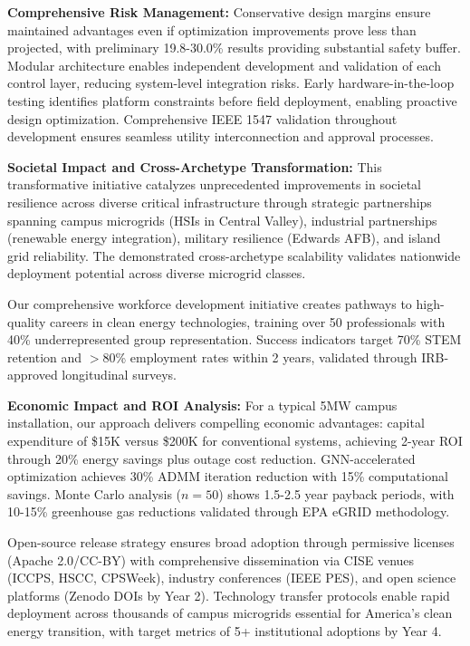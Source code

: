 \documentclass[12pt]{article}
\begin{document}
\textbf{Comprehensive Risk Management:} Conservative design margins ensure maintained advantages even if optimization improvements prove less than projected, with preliminary 19.8-30.0\% results providing substantial safety buffer. Modular architecture enables independent development and validation of each control layer, reducing system-level integration risks. Early hardware-in-the-loop testing identifies platform constraints before field deployment, enabling proactive design optimization. Comprehensive IEEE 1547 validation \cite{ieee1547} throughout development ensures seamless utility interconnection and approval processes.

\textbf{Societal Impact and Cross-Archetype Transformation:} This transformative initiative catalyzes unprecedented improvements in societal resilience across diverse critical infrastructure through strategic partnerships spanning campus microgrids (HSIs in Central Valley), industrial partnerships (renewable energy integration), military resilience (Edwards AFB), and island grid reliability. The demonstrated cross-archetype scalability validates nationwide deployment potential across diverse microgrid classes.

Our comprehensive workforce development initiative creates pathways to high-quality careers in clean energy technologies, training over 50 professionals with 40\% underrepresented group representation. Success indicators target 70\% STEM retention and $>$80\% employment rates within 2 years, validated through IRB-approved longitudinal surveys.

\textbf{Economic Impact and ROI Analysis:} For a typical 5MW campus installation, our approach delivers compelling economic advantages: capital expenditure of \$15K versus \$200K for conventional systems, achieving 2-year ROI through 20\% energy savings plus outage cost reduction. GNN-accelerated optimization achieves 30\% ADMM iteration reduction with 15\% computational savings. Monte Carlo analysis ($n=50$) shows 1.5-2.5 year payback periods, with 10-15\% greenhouse gas reductions validated through EPA eGRID methodology.

Open-source release strategy ensures broad adoption through permissive licenses (Apache 2.0/CC-BY) with comprehensive dissemination via CISE venues (ICCPS, HSCC, CPSWeek), industry conferences (IEEE PES), and open science platforms (Zenodo DOIs by Year 2). Technology transfer protocols enable rapid deployment across thousands of campus microgrids essential for America's clean energy transition, with target metrics of 5+ institutional adoptions by Year 4.
\end{document}

